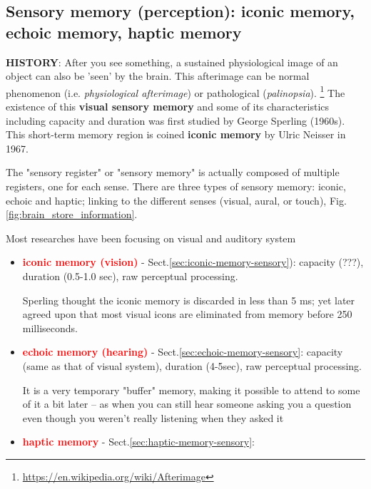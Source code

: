 


\subsection{Sensory memory (perception): iconic memory, echoic memory, haptic
memory}
\label{sec:sensory-memory}

\begin{mdframed}
{\bf HISTORY}: After you see something, a  sustained physiological image of an
object can also be 'seen' by the brain. This afterimage can be normal phenomenon
(i.e. {\it physiological afterimage}) or pathological ({\it palinopsia}).
\footnote{\url{https://en.wikipedia.org/wiki/Afterimage}} 
The existence of this {\bf visual sensory memory} and some of its
characteristics including capacity and duration was first studied by George
Sperling (1960s). This short-term memory region is coined {\bf  iconic memory}
by Ulric Neisser in 1967.

\end{mdframed}

The "sensory register" or "sensory memory" is actually composed of multiple
registers, one for each sense.  
There are three types of sensory memory: iconic, echoic and haptic;
linking to the different senses (visual, aural, or touch),
Fig.\ref{fig:brain_store_information}.

Most researches have been focusing on visual and auditory system
\begin{itemize}
  \item \textcolor{red}{\bf iconic memory (vision)} -
  Sect.\ref{sec:iconic-memory-sensory}):
  capacity (???), duration (0.5-1.0 sec), raw perceptual processing.

Sperling thought the iconic memory is discarded in less than 5 ms; yet later
agreed upon that most visual icons are eliminated from memory before 250
milliseconds.
 
  \item \textcolor{red}{\bf echoic memory (hearing)} -
  Sect.\ref{sec:echoic-memory-sensory}:
  capacity (same as that of visual system), duration (4-5sec), raw perceptual processing.
  
It is a very temporary "buffer" memory, making it possible to attend to some of
it a bit later -- as when you can still hear someone asking you a question even
though you weren't really listening when they asked it

  \item \textcolor{red}{\bf haptic memory} -
  Sect.\ref{sec:haptic-memory-sensory}:
\end{itemize}

